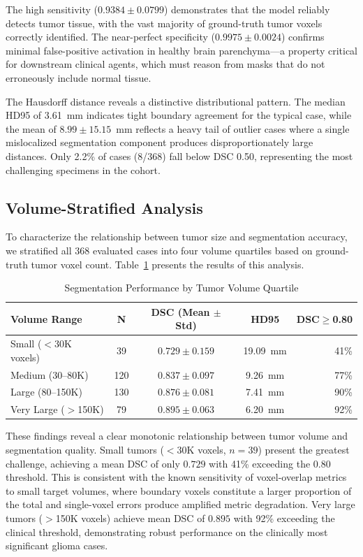 The high sensitivity ($0.9384 \pm 0.0799$) demonstrates that the model reliably detects tumor tissue, with the vast majority of ground-truth tumor voxels correctly identified. The near-perfect specificity ($0.9975 \pm 0.0024$) confirms minimal false-positive activation in healthy brain parenchyma---a property critical for downstream clinical agents, which must reason from masks that do not erroneously include normal tissue.

The Hausdorff distance reveals a distinctive distributional pattern. The median HD95 of 3.61~mm indicates tight boundary agreement for the typical case, while the mean of $8.99 \pm 15.15$~mm reflects a heavy tail of outlier cases where a single mislocalized segmentation component produces disproportionately large distances. Only 2.2\% of cases (8/368) fall below DSC 0.50, representing the most challenging specimens in the cohort.

\subsection{Volume-Stratified Analysis}
To characterize the relationship between tumor size and segmentation accuracy, we stratified all 368 evaluated cases into four volume quartiles based on ground-truth tumor voxel count. Table~\ref{tab:vol_quartile} presents the results of this analysis.

\begin{table}[t]
\centering
\caption{Segmentation Performance by Tumor Volume Quartile}
\label{tab:vol_quartile}
\begin{tabular}{lcccr}
\hline
\textbf{Volume Range} & \textbf{N} & \textbf{DSC (Mean $\pm$ Std)} & \textbf{HD95} & \textbf{DSC$\geq$0.80} \\
\hline
Small ($<$30K voxels) & 39 & $0.729 \pm 0.159$ & 19.09~mm & 41\% \\
Medium (30--80K) & 120 & $0.837 \pm 0.097$ & 9.26~mm & 77\% \\
Large (80--150K) & 130 & $0.876 \pm 0.081$ & 7.41~mm & 90\% \\
Very Large ($>$150K) & 79 & $0.895 \pm 0.063$ & 6.20~mm & 92\% \\
\hline
\end{tabular}
\end{table}

These findings reveal a clear monotonic relationship between tumor volume and segmentation quality. Small tumors ($<$30K voxels, $n=39$) present the greatest challenge, achieving a mean DSC of only $0.729$ with 41\% exceeding the 0.80 threshold. This is consistent with the known sensitivity of voxel-overlap metrics to small target volumes, where boundary voxels constitute a larger proportion of the total and single-voxel errors produce amplified metric degradation. Very large tumors ($>$150K voxels) achieve mean DSC of $0.895$ with 92\% exceeding the clinical threshold, demonstrating robust performance on the clinically most significant glioma cases.

